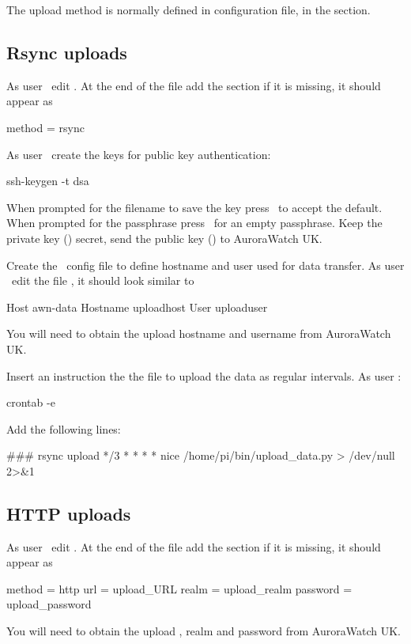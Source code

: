 The upload method is normally defined in 
configuration file, in the \filename{[upload]} section.

\subsection{Rsync uploads}

As user \rootUser\ edit . At the end of the
file add the \filename{[upload]} section if it is missing, it should
appear as
\begin{Code}
[upload]
method = rsync
\end{Code}

As user \piUser\ create the keys for public key authentication:
\begin{Cmd}
ssh-keygen -t dsa
\end{Cmd}
When prompted for the filename to save the key press \myreturn\ to
accept the default. When prompted for the passphrase press \myreturn\
for an empty passphrase. Keep the private key
() secret, send the public key
() to AuroraWatch UK.

Create the \ssh\ config file to define hostname and user used for data
transfer. As user \piUser\ edit the file
, it should look similar to
\begin{Code}
Host awn-data
Hostname uploadhost
User uploaduser
\end{Code}
You will need to obtain the upload hostname and username from
AuroraWatch UK.

Insert an instruction the the  file to upload the
data as regular intervals. As user \piUser:
\begin{Cmd}
crontab -e
\end{Cmd}
Add the following lines:
\begin{Code}
### rsync upload
*/3 * * * * nice /home/pi/bin/upload_data.py > /dev/null 2>&1
\end{Code}

\subsection{HTTP uploads}
As user \rootUser\ edit . At the end of the
file add the \filename{[upload]} section if it is missing, it should
appear as
\begin{Code}
[upload]
method = http
url = upload_URL
realm = upload_realm
password = upload_password
\end{Code}
You will need to obtain the upload \URL, realm and password from
AuroraWatch UK.

